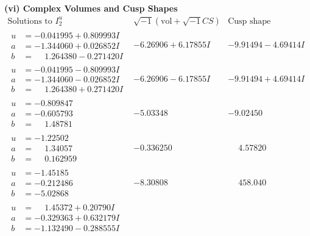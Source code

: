 \documentclass[1p]{elsarticle_modified}
\theoremstyle{definition}
\newcommand{\I}{\sqrt{-1}}
\begin{document}
\newpage\flushleft \textbf{(vi) Complex Volumes and Cusp Shapes}
$$\begin{array}{c|c|c}  
\text{Solutions to }I^u_{2}& \I (\text{vol} + \sqrt{-1}CS) & \text{Cusp shape}\\
 \hline 
\begin{aligned}
u &= -0.041995 + 0.809993 I \\
a &= -1.344060 + 0.026852 I \\
b &= \phantom{-}1.264380 - 0.271420 I\end{aligned}
 & -6.26906 + 6.17855 I & -9.91494 - 4.69414 I \\ \hline\begin{aligned}
u &= -0.041995 - 0.809993 I \\
a &= -1.344060 - 0.026852 I \\
b &= \phantom{-}1.264380 + 0.271420 I\end{aligned}
 & -6.26906 - 6.17855 I & -9.91494 + 4.69414 I \\ \hline\begin{aligned}
u &= -0.809847\phantom{ +0.000000I} \\
a &= -0.605793\phantom{ +0.000000I} \\
b &= \phantom{-}1.48781\phantom{ +0.000000I}\end{aligned}
 & -5.03348\phantom{ +0.000000I} & -9.02450\phantom{ +0.000000I} \\ \hline\begin{aligned}
u &= -1.22502\phantom{ +0.000000I} \\
a &= \phantom{-}1.34057\phantom{ +0.000000I} \\
b &= \phantom{-}0.162959\phantom{ +0.000000I}\end{aligned}
 & -0.336250\phantom{ +0.000000I} & \phantom{-}4.57820\phantom{ +0.000000I} \\ \hline\begin{aligned}
u &= -1.45185\phantom{ +0.000000I} \\
a &= -0.212486\phantom{ +0.000000I} \\
b &= -5.02868\phantom{ +0.000000I}\end{aligned}
 & -8.30808\phantom{ +0.000000I} & \phantom{-}458.040\phantom{ +0.000000I} \\ \hline\begin{aligned}
u &= \phantom{-}1.45372 + 0.20790 I \\
a &= -0.329363 + 0.632179 I \\
b &= -1.132490 - 0.288555 I\end{aligned}

\end{array}$$
\end{document}
